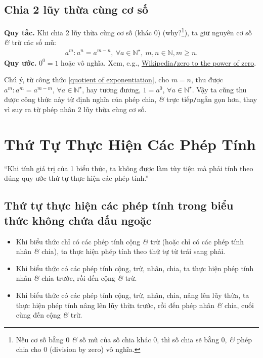 \documentclass[oneside]{book}
\numberwithin{equation}{section}
\begin{document}
\subsection{Chia 2 lũy thừa cùng cơ số}
\textbf{Quy tắc.} Khi chia 2 lũy thừa cùng cơ số (khác $0$) (why?\footnote{Nếu cơ số bằng 0 \textit{\&} số mũ của số chia khác 0, thì số chia sẽ bằng 0, \textit{\&} phép chia cho 0 (division by zero) vô nghĩa.}), ta giữ nguyên cơ số \textit{\&} trừ các số mũ:
\begin{align}
	\label{quotient of exponentiation}
	\boxed{a^m:a^n = a^{m-n},\ \forall a\in\mathbb{N}^\star,\ m,n\in\mathbb{N},m\ge n.}
\end{align}
\textbf{Quy ước.} $0^0 = 1$ hoặc vô nghĩa. Xem, e.g., \href{https://en.wikipedia.org/wiki/Zero_to_the_power_of_zero}{Wikipedia\texttt{/}zero to the power of zero}.

Chú ý, từ công thức \eqref{quotient of exponentiation}, cho $m = n$, thu được $a^m:a^m = a^{m - m}$, $\forall a\in\mathbb{N}^\star$, hay tương đương, $1 = a^0$, $\forall a\in\mathbb{N}^\star$. Vậy ta cũng thu được công thức này từ định nghĩa của phép chia, \textit{\&} trực tiếp\texttt{/}ngắn gọn hơn, thay vì suy ra từ phép nhân 2 lũy thừa cùng cơ số.

\section{Thứ Tự Thực Hiện Các Phép Tính}
``Khi tính giá trị của 1 biểu thức, ta không được làm tùy tiện mà phải tính theo đúng quy ước thứ tự thực hiện các phép tính.'' -- \cite[p. 26]{Thai_Anh_Dat_Ha_Loan_Nam_Quang_Toan_6_tap_2}

\subsection{Thứ tự thực hiện các phép tính trong biểu thức không chứa dấu ngoặc}
\begin{tcolorbox}
	\begin{itemize}
		\item Khi biểu thức chỉ có các phép tính cộng \textit{\&} trừ (hoặc chỉ có các phép tính nhân \textit{\&} chia), ta thực hiện phép tính theo thứ tự từ trái sang phải.
		\item Khi biểu thức có các phép tính cộng, trừ, nhân, chia, ta thực hiện phép tính nhân \textit{\&} chia trước, rồi đến cộng \textit{\&} trừ.
		\item Khi biểu thức có các phép tính cộng, trừ, nhân, chia, nâng lên lũy thừa, ta thực hiện phép tính nâng lên lũy thừa trước, rồi đến phép nhân \textit{\&} chia, cuối cùng đến cộng \textit{\&} trừ.
	\end{itemize}
\end{tcolorbox}
\end{document}

